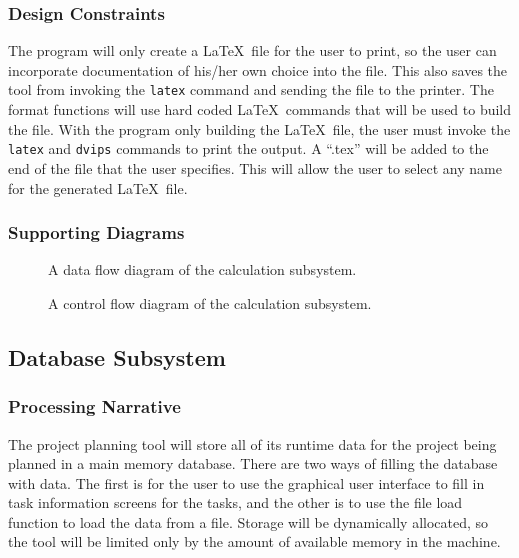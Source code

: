 \subsubsection{Design Constraints}

The program will only create a \LaTeX\ file for the user to print, so
the user can incorporate documentation of his/her own choice into the
file.  This also saves the tool from invoking the {\tt latex} command
and sending the file to the printer. The format functions will use
hard coded \LaTeX\ commands that will be used to build the file. With
the program only building the \LaTeX\ file, the user must invoke the
{\tt latex} and {\tt dvips} commands to print the output. A ``.tex''
will be added to the end of the file that the user specifies.
This will allow the user to select any name for the generated \LaTeX\
file.

\subsubsection{Supporting Diagrams}

\begin{figure}
\centering
\centerline{}
\caption[Data Flow Diagram of \LaTeX\ Subsystem]{\label{latex-dfd} 
A data flow diagram of the calculation subsystem.}
\end{figure}

\begin{figure}
\centering
\centerline{}
\caption[Control Flow Diagram of \LaTeX\ Subsystem]{\label{latex-cfd} 
A control flow diagram of the calculation subsystem.}
\end{figure}

\subsection{Database Subsystem}

\subsubsection{Processing Narrative}

The project planning tool will store all of its runtime data for the
project being planned in a main memory database.  There are two ways of
filling the database with data.  The first is for the user
to use the graphical user interface to fill in task information
screens for the tasks, and the other is to use the file load function
to load the data from a file.  Storage will be dynamically allocated,
so the tool will be limited only by the amount of available memory in the
machine.

